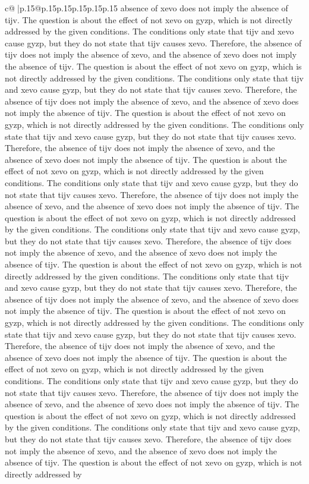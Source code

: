 \documentclass{article}
\begin{document}
{\begin{supertabular}{c@{$\;$}|p{.15\linewidth}@{}p{.15\linewidth}p{.15\linewidth}p{.15\linewidth}p{.15\linewidth}p{.15\linewidth}}
{{{absence of xevo does not imply the absence of tijv. The question is about the effect of not xevo on gyzp, which is not directly addressed by the given conditions. The conditions only state that tijv and xevo cause gyzp, but they do not state that tijv causes xevo. Therefore, the absence of tijv does not imply the absence of xevo, and the absence of xevo does not imply the absence of tijv. The question is about the effect of not xevo on gyzp, which is not directly addressed by the given conditions. The conditions only state that tijv and xevo cause gyzp, but they do not state that tijv causes xevo. Therefore, the absence of tijv does not imply the absence of xevo, and the absence of xevo does not imply the absence of tijv. The question is about the effect of not xevo on gyzp, which is not directly addressed by the given conditions. The conditions only state that tijv and xevo cause gyzp, but they do not state that tijv causes xevo. Therefore, the absence of tijv does not imply the absence of xevo, and the absence of xevo does not imply the absence of tijv. The question is about the effect of not xevo on gyzp, which is not directly addressed by the given conditions. The conditions only state that tijv and xevo cause gyzp, but they do not state that tijv causes xevo. Therefore, the absence of tijv does not imply the absence of xevo, and the absence of xevo does not imply the absence of tijv. The question is about the effect of not xevo on gyzp, which is not directly addressed by the given conditions. The conditions only state that tijv and xevo cause gyzp, but they do not state that tijv causes xevo. Therefore, the absence of tijv does not imply the absence of xevo, and the absence of xevo does not imply the absence of tijv. The question is about the effect of not xevo on gyzp, which is not directly addressed by the given conditions. The conditions only state that tijv and xevo cause gyzp, but they do not state that tijv causes xevo. Therefore, the absence of tijv does not imply the absence of xevo, and the absence of xevo does not imply the absence of tijv. The question is about the effect of not xevo on gyzp, which is not directly addressed by the given conditions. The conditions only state that tijv and xevo cause gyzp, but they do not state that tijv causes xevo. Therefore, the absence of tijv does not imply the absence of xevo, and the absence of xevo does not imply the absence of tijv. The question is about the effect of not xevo on gyzp, which is not directly addressed by the given conditions. The conditions only state that tijv and xevo cause gyzp, but they do not state that tijv causes xevo. Therefore, the absence of tijv does not imply the absence of xevo, and the absence of xevo does not imply the absence of tijv. The question is about the effect of not xevo on gyzp, which is not directly addressed by the given conditions. The conditions only state that tijv and xevo cause gyzp, but they do not state that tijv causes xevo. Therefore, the absence of tijv does not imply the absence of xevo, and the absence of xevo does not imply the absence of tijv. The question is about the effect of not xevo on gyzp, which is not directly addressed by }}}
\end{supertabular}}
\end{document}
